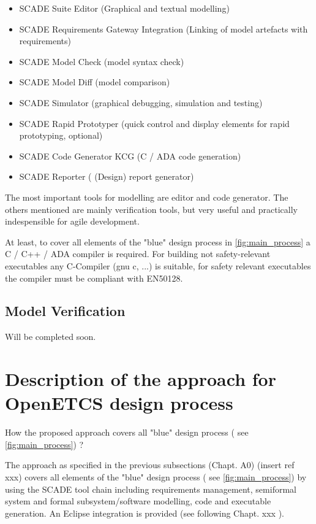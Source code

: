 \begin{itemize}
	\item SCADE Suite Editor (Graphical and textual modelling)
	\item SCADE Requirements Gateway Integration (Linking of model artefacts with requirements)
	\item SCADE Model Check (model syntax check)
	\item SCADE Model Diff (model comparison)
	\item SCADE Simulator (graphical debugging, simulation and testing) 
	\item SCADE Rapid Prototyper (quick control and display elements for rapid prototyping, optional)
	\item SCADE Code Generator KCG (C / ADA code generation)
	\item SCADE Reporter ( (Design) report generator)
\end{itemize}

The most important tools for modelling are editor and code generator. The others mentioned are mainly verification tools, but very useful and practically indespensible for agile development.

At least, to cover all elements of the "blue" design process in \ref{fig:main_process} a C / C++ / ADA compiler is required. 
For building not safety-relevant executables any C-Compiler (gnu c, ...) is suitable, for safety relevant executables the compiler must be compliant with EN50128.   

\subsection{Model Verification}
\label{sec:SysML_SCADE_ModelVerification}

Will be completed soon. 

\section{Description of the approach for OpenETCS design process}

\begin{todo_comment}
How the proposed approach covers all "blue" design process ( see \ref{fig:main_process}) ?
\end{todo_comment}

The approach as specified in the previous subsections (Chapt. A0) (insert ref xxx) covers all elements of the "blue" design process ( see \ref{fig:main_process}) 
by using the SCADE tool chain including requirements management, semiformal system and formal subsystem/software modelling, code and executable generation. 
An Eclipse integration is provided (see following Chapt. xxx ). 

